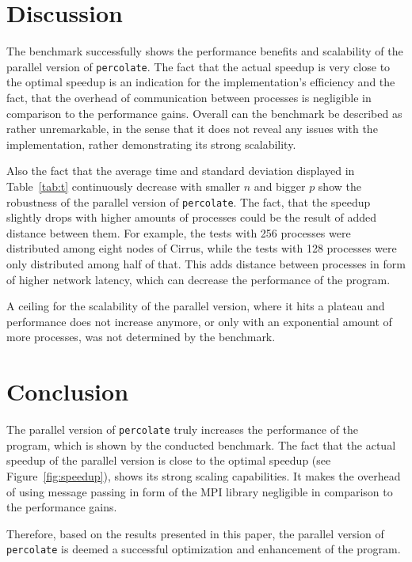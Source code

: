 \documentclass[twoside,11pt]{article}
\def\perc{\texttt{perco\-late}}
\begin{document}
\section{Discussion} %

The benchmark successfully shows the performance benefits
and scalability of the parallel version of \perc{}.
The fact that the actual speedup is very close to the
optimal speedup is an indication for the implementation's
efficiency and the fact, that the overhead of communication
between processes is negligible in comparison to the
performance gains.
Overall can the benchmark be described as rather
unremarkable, in the sense that it does not reveal any
issues with the implementation, rather demonstrating its
strong scalability.

Also the fact that the average time and standard deviation
displayed in Table~\ref{tab:t} continuously decrease with
smaller $n$ and bigger $p$ show the robustness of the
parallel version of \perc{}.
The fact, that the speedup slightly drops with higher
amounts of processes could be the result of added distance
between them.
For example, the tests with 256 processes were distributed
among eight nodes of Cirrus, while the tests with 128
processes were only distributed among half of that.
This adds distance between processes in form of higher
network latency, which can decrease the performance of
the program.

A ceiling for the scalability of the parallel version,
where it hits a plateau and performance does not increase
anymore, or only with an exponential amount of more
processes, was not determined by the benchmark.


\section{Conclusion} %

The parallel version of \perc{} truly increases the
performance of the program, which is shown by the conducted
benchmark.
The fact that the actual speedup of the parallel version is
close to the optimal speedup (see Figure~\ref{fig:speedup}),
shows its strong scaling capabilities.
It makes the overhead of using message passing in form of
the MPI library negligible in comparison to the performance
gains.

Therefore, based on the results presented in this paper,
the parallel version of \perc{} is deemed a successful
optimization and enhancement of the program.



\end{document}
